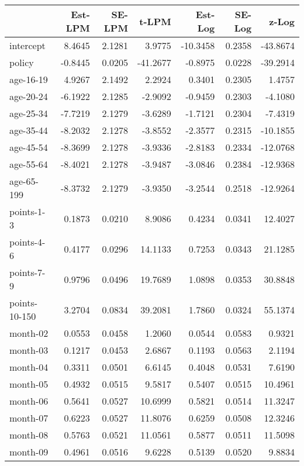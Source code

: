 \documentclass[10pt]{article}
\begin{document}
\begin{table}[ht]
\centering
\begin{tabular}{lrrrrrr}
  \hline
 & Est-LPM & SE-LPM & t-LPM & Est-Log & SE-Log & z-Log \\ 
  \hline
intercept & 8.4645 & 2.1281 & 3.9775 & -10.3458 & 0.2358 & -43.8674 \\ 
  policy & -0.8445 & 0.0205 & -41.2677 & -0.8975 & 0.0228 & -39.2914 \\ 
  age-16-19 & 4.9267 & 2.1492 & 2.2924 & 0.3401 & 0.2305 & 1.4757 \\ 
  age-20-24 & -6.1922 & 2.1285 & -2.9092 & -0.9459 & 0.2303 & -4.1080 \\ 
  age-25-34 & -7.7219 & 2.1279 & -3.6289 & -1.7121 & 0.2304 & -7.4319 \\ 
  age-35-44 & -8.2032 & 2.1278 & -3.8552 & -2.3577 & 0.2315 & -10.1855 \\ 
  age-45-54 & -8.3699 & 2.1278 & -3.9336 & -2.8183 & 0.2334 & -12.0768 \\ 
  age-55-64 & -8.4021 & 2.1278 & -3.9487 & -3.0846 & 0.2384 & -12.9368 \\ 
  age-65-199 & -8.3732 & 2.1279 & -3.9350 & -3.2544 & 0.2518 & -12.9264 \\ 
  points-1-3 & 0.1873 & 0.0210 & 8.9086 & 0.4234 & 0.0341 & 12.4027 \\ 
  points-4-6 & 0.4177 & 0.0296 & 14.1133 & 0.7253 & 0.0343 & 21.1285 \\ 
  points-7-9 & 0.9796 & 0.0496 & 19.7689 & 1.0898 & 0.0353 & 30.8848 \\ 
  points-10-150 & 3.2704 & 0.0834 & 39.2081 & 1.7860 & 0.0324 & 55.1374 \\ 
  month-02 & 0.0553 & 0.0458 & 1.2060 & 0.0544 & 0.0583 & 0.9321 \\ 
  month-03 & 0.1217 & 0.0453 & 2.6867 & 0.1193 & 0.0563 & 2.1194 \\ 
  month-04 & 0.3311 & 0.0501 & 6.6145 & 0.4048 & 0.0531 & 7.6190 \\ 
  month-05 & 0.4932 & 0.0515 & 9.5817 & 0.5407 & 0.0515 & 10.4961 \\ 
  month-06 & 0.5641 & 0.0527 & 10.6999 & 0.5821 & 0.0514 & 11.3247 \\ 
  month-07 & 0.6223 & 0.0527 & 11.8076 & 0.6259 & 0.0508 & 12.3246 \\ 
  month-08 & 0.5763 & 0.0521 & 11.0561 & 0.5877 & 0.0511 & 11.5098 \\ 
  month-09 & 0.4961 & 0.0516 & 9.6228 & 0.5139 & 0.0520 & 9.8834 \\ 

\end{tabular}
\end{table}
\end{document}
